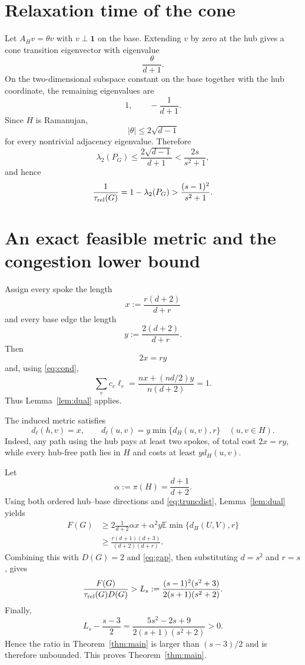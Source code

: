 \documentclass[11pt]{article}
\newcommand{\E}{\mathbb E}
\begin{document}
\section{Relaxation time of the cone}
Let $A_Hv=\theta v$ with $v\perp\mathbf 1$ on the base.  Extending $v$ by zero at the hub gives a cone transition eigenvector with eigenvalue
\[
 \frac{\theta}{d+1}.
\]
On the two-dimensional subspace constant on the base together with the hub coordinate, the remaining eigenvalues are
\[
 1,\qquad -\frac1{d+1}.
\]
Since $H$ is Ramanujan,
\[
 |\theta|\le2\sqrt{d-1}
\]
for every nontrivial adjacency eigenvalue.  Therefore
\[
 \lambda_2(P_G)\le\frac{2\sqrt{d-1}}{d+1}
 <\frac{2s}{s^2+1},
\]
and hence
\begin{equation}\label{eq:gap}
 \frac1{\tau_{\rm rel}(G)}=1-\lambda_2(P_G)
 >\frac{(s-1)^2}{s^2+1}.
\end{equation}

\section{An exact feasible metric and the congestion lower bound}
Assign every spoke the length
\[
 x:=\frac{r(d+2)}{d+r}
\]
and every base edge the length
\[
 y:=\frac{2(d+2)}{d+r}.
\]
Then
\[
 2x=ry
\]
and, using \eqref{eq:cond},
\[
 \sum_ec_e\ell_e
 =\frac{nx+(nd/2)y}{n(d+2)}=1.
\]
Thus Lemma~\ref{lem:dual} applies.

The induced metric satisfies
\[
 d_\ell(h,v)=x,
 \qquad
 d_\ell(u,v)=y\min\{d_H(u,v),r\}
 \quad(u,v\in H).
\]
Indeed, any path using the hub pays at least two spokes, of total cost $2x=ry$, while every hub-free path lies in $H$ and costs at least $y d_H(u,v)$.

Let
\[
 \alpha:=\pi(H)=\frac{d+1}{d+2}.
\]
Using both ordered hub--base directions and \eqref{eq:truncdist}, Lemma~\ref{lem:dual} yields
\begin{align*}
 F(G)
 &\ge 2\frac1{d+2}\alpha x
 +\alpha^2y\E\min\{d_H(U,V),r\}\\
 &\ge
 \frac{r(d+1)(d+3)}{(d+2)(d+r)}.
\end{align*}
Combining this with $D(G)=2$ and \eqref{eq:gap}, then substituting $d=s^2$ and $r=s$, gives
\begin{equation}\label{eq:Ls}
 \frac{F(G)}{\tau_{\rm rel}(G)D(G)}
 >L_s:=
 \frac{(s-1)^2(s^2+3)}{2(s+1)(s^2+2)}.
\end{equation}
Finally,
\begin{equation}\label{eq:diverge}
 L_s-\frac{s-3}{2}
 =\frac{5s^2-2s+9}{2(s+1)(s^2+2)}>0.
\end{equation}
Hence the ratio in Theorem~\ref{thm:main} is larger than $(s-3)/2$ and is therefore unbounded.  This proves Theorem~\ref{thm:main}.
\end{document}
